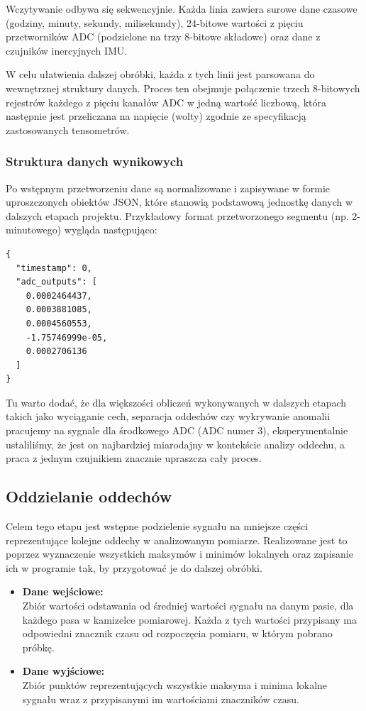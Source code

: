 Wczytywanie odbywa się sekwencyjnie. Każda linia zawiera surowe dane czasowe
(godziny, minuty, sekundy, milisekundy), 24-bitowe wartości z pięciu
przetworników ADC (podzielone na trzy 8-bitowe składowe) oraz dane z czujników
inercyjnych IMU.

W celu ułatwienia dalszej obróbki, każda z tych linii jest parsowana do wewnętrznej
struktury danych. Proces ten obejmuje połączenie trzech 8-bitowych rejestrów każdego
z pięciu kanałów ADC w jedną wartość liczbową, która następnie jest przeliczana
na napięcie (wolty) zgodnie ze specyfikacją zastosowanych tensometrów.

\subsubsection{Struktura danych wynikowych}
Po wstępnym przetworzeniu dane są normalizowane i zapisywane w formie uproszczonych 
obiektów JSON, które stanowią podstawową jednostkę danych w dalszych etapach projektu. 
Przykładowy format przetworzonego segmentu (np. 2-minutowego) wygląda następująco:

\begin{verbatim}
{
  "timestamp": 0,
  "adc_outputs": [
    0.0002464437, 
    0.0003881085, 
    0.0004560553, 
    -1.75746999e-05, 
    0.0002706136
  ]
}
\end{verbatim}

Tu warto dodać, że dla większości obliczeń wykonywanych w dalszych etapach takich jako
wyciąganie cech, separacja oddechów czy wykrywanie anomalii pracujemy na sygnale dla 
środkowego ADC (ADC numer 3), eksperymentalnie ustaliliśmy, że jest on najbardziej miarodajny
w kontekście analizy oddechu, a praca z jednym czujnikiem znacznie upraszcza cały proces.

\subsection{Oddzielanie oddechów}
Celem tego etapu jest wstępne podzielenie sygnału na mniejsze części reprezentujące
kolejne oddechy w analizowanym pomiarze. Realizowane jest to poprzez wyznaczenie 
wszystkich maksymów i minimów lokalnych oraz zapisanie ich w programie tak, by
przygotować je do dalszej obróbki.

\begin{itemize}
    \item \textbf{Dane wejściowe:} \\
    Zbiór wartości odstawania od średniej wartości sygnału na danym pasie, dla każdego
    pasa w kamizelce pomiarowej. Każda z tych wartości przypisany ma odpowiedni 
    znacznik czasu od rozpoczęcia pomiaru, w którym pobrano próbkę.
    \item \textbf{Dane wyjściowe:} \\
    Zbiór punktów reprezentujących wszystkie maksyma i minima lokalne sygnału 
    wraz z przypisanymi im wartościami znaczników czasu.
\end{itemize}


